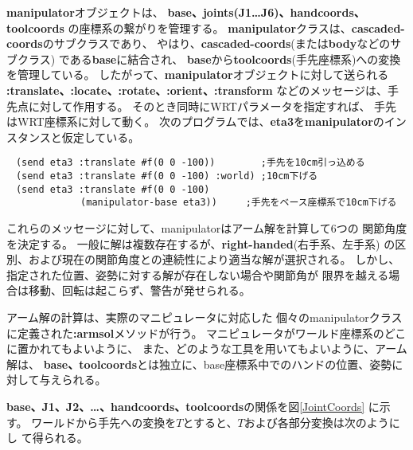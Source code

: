 \begin{refdesc}
\end{refdesc}

{\bf manipulator}オブジェクトは、
{\bf base、joints(J1\ldots J6)、handcoords、toolcoords}
の座標系の繋がりを管理する。
{\bf manipulator}クラスは、{\bf cascaded-coords}のサブクラスであり、
やはり、{\bf cascaded-coords}(または{\bf body}などのサブクラス)
である{\bf base}に結合され、
{\bf base}から{\bf toolcoords}(手先座標系)への変換を管理している。
したがって、{\bf manipulator}オブジェクトに対して送られる
{\bf :translate、:locate、:rotate、:orient、:transform}
などのメッセージは、手先点に対して作用する。
そのとき同時にWRTパラメータを指定すれば、
手先はWRT座標系に対して動く。
次のプログラムでは、{\bf eta3}を{\bf manipulator}のインスタンスと仮定している。

\begin{verbatim}
　(send eta3 :translate #f(0 0 -100))        ;手先を10cm引っ込める　
　(send eta3 :translate #f(0 0 -100) :world) ;10cm下げる
　(send eta3 :translate #f(0 0 -100)
             (manipulator-base eta3))     ;手先をベース座標系で10cm下げる
\end{verbatim}

これらのメッセージに対して、manipulatorはアーム解を計算して6つの
関節角度を決定する。
一般に解は複数存在するが、{\bf right-handed}(右手系、左手系)
の区別、および現在の関節角度との連続性により適当な解が選択される。
しかし、指定された位置、姿勢に対する解が存在しない場合や関節角が
限界を越える場合は移動、回転は起こらず、警告が発せられる。

アーム解の計算は、実際のマニピュレータに対応した
個々のmanipulatorクラスに定義された{\bf :armsol}メソッドが行う。
マニピュレータがワールド座標系のどこに置かれてもよいように、
また、どのような工具を用いてもよいように、アーム解は、
{\bf base、toolcoords}とは独立に、base座標系中でのハンドの位置、姿勢に
対して与えられる。

{\bf base、J1、J2、\ldots 、handcoords、toolcoords}の関係を図\ref{JointCoords}
に示す。
ワールドから手先への変換を$T$とすると、$T$および各部分変換は次のようにし
て得られる。

